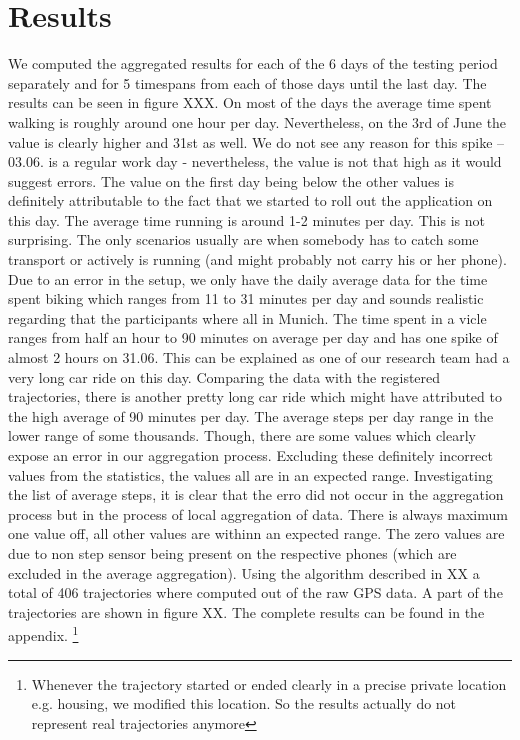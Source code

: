 \section{Results}
We computed the aggregated results for each of the 6 days of the testing period separately and for 5 timespans from each of those days until the last day. The results can be seen in figure XXX. 
On most of the days the average time spent walking is roughly around one hour per day. Nevertheless, on the 3rd of June the value is clearly higher and 31st as well. We do not see any reason for this spike -- 03.06. is a regular work day - nevertheless, the value is not that high as it would suggest errors. The value on the first day being below the other values is definitely attributable to the fact that we started to roll out the application on this day.
The average time running is around 1-2 minutes per day. This is not surprising. The only scenarios usually are when somebody has to catch some transport or actively is running (and might probably not carry his or her phone).
Due to an error in the setup, we only have the daily average data for the time spent biking which ranges from 11 to 31 minutes per day and sounds realistic regarding that the participants where all in Munich.
The time spent in a  vicle ranges from half an hour to 90 minutes on average per day and has one spike of almost 2 hours on 31.06. This can be explained as one of our research team had a very long car ride on this day. Comparing the data with the registered trajectories, there is another pretty long car ride which might have attributed to the high average of 90 minutes per day. 
The average steps per day range in the lower range of some thousands. Though, there are some values which clearly expose an error in our aggregation process. Excluding these definitely incorrect values from the statistics, the values all are in an expected range. 
Investigating the list of average steps, it is clear that the erro did not occur in the aggregation process but in the process of local aggregation of data. There is always maximum one value off, all other values are withinn an expected range. The zero values are due to non step sensor being present on the respective phones (which are excluded in the average aggregation).
Using the algorithm described in XX a total of 406 trajectories where computed out of the raw GPS data. A part of the trajectories are shown in figure XX. The complete results can be found in the appendix. \footnote{Whenever the trajectory started or ended clearly in a precise private location e.g. housing, we modified this location. So the results actually do not represent real trajectories anymore} 

